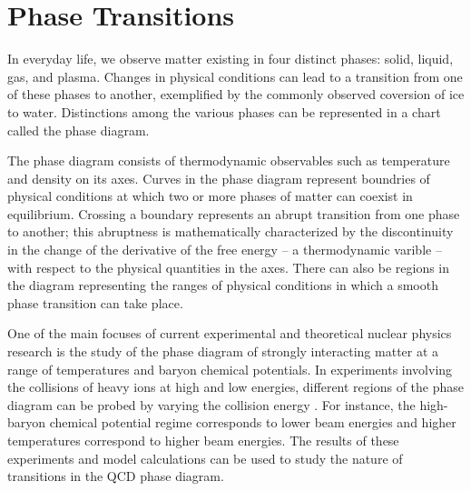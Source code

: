 \section{Phase Transitions}
In everyday life, we observe matter existing in four distinct phases: solid, liquid, gas, and plasma. Changes in physical conditions can lead to a transition from one of these phases to another, exemplified by the commonly observed coversion of ice to water. Distinctions among the various phases can be represented in a chart called the phase diagram.

The phase diagram consists of thermodynamic observables such as temperature and density on its axes. Curves in the phase diagram represent boundries of physical conditions at which two or more phases of matter can coexist in equilibrium. Crossing a boundary represents an abrupt transition from one phase to another; this abruptness is mathematically characterized by the discontinuity in the change of the derivative of the free energy -- a thermodynamic varible -- with respect to the physical quantities in the axes. There can also be regions in the diagram representing the ranges of physical conditions in which a smooth phase transition can take place.

One of the main focuses of current experimental and theoretical nuclear physics research is the study of the phase diagram of strongly interacting matter at a range of temperatures and baryon chemical potentials. In experiments involving the collisions of heavy ions at high and low energies, different regions of the phase diagram can be probed by varying the collision energy \cite{PhysRevC.93.024901}. For instance, the high-baryon chemical potential regime corresponds to lower beam energies and higher temperatures correspond to higher beam energies. The results of these experiments and model calculations can be used to study the nature of transitions in the QCD phase diagram.

